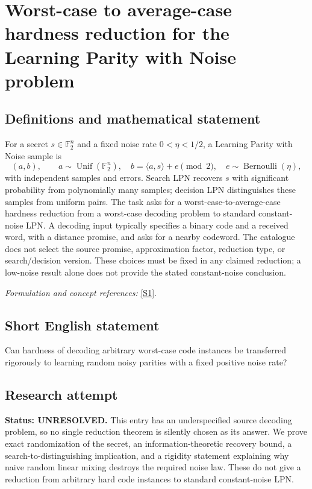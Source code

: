 \documentclass[11pt]{article}
\begin{document}
\section*{\texorpdfstring{Worst-case to average-case hardness reduction for the Learning Parity with Noise problem}{Worst-case to average-case hardness reduction for the Learning Parity with Noise problem}}\label{30006864}
\subsection{Definitions and mathematical statement}
For a secret $s\in{\mathbb{F}}_2^n$ and a fixed noise rate $0<\eta<1/2$, a Learning Parity with Noise sample is
\[
 (a,b),\qquad a\sim\operatorname{Unif}({\mathbb{F}}_2^n),\quad
 b=\langle a,s\rangle+e\pmod2,\quad e\sim\operatorname{Bernoulli}(\eta),
\]
with independent samples and errors. Search LPN recovers $s$ with significant probability from polynomially many samples; decision LPN distinguishes these samples from uniform pairs. The task asks for a worst-case-to-average-case hardness reduction from a worst-case decoding problem to standard constant-noise LPN. A decoding input typically specifies a binary code and a received word, with a distance promise, and asks for a nearby codeword. The catalogue does not select the source promise, approximation factor, reduction type, or search/decision version. These choices must be fixed in any claimed reduction; a low-noise result alone does not provide the stated constant-noise conclusion.
\par\smallskip\textit{Formulation and concept references:} \href{https://eprint.iacr.org/2026/1168}{[S1]}.

\subsection{Short English statement}
Can hardness of decoding arbitrary worst-case code instances be transferred rigorously to learning random noisy parities with a fixed positive noise rate?
\subsection{Research attempt}
\textbf{Status: UNRESOLVED.} This entry has an underspecified source decoding problem, so no single reduction theorem is silently chosen as its answer. We prove exact randomization of the secret, an information-theoretic recovery bound, a search-to-distinguishing implication, and a rigidity statement explaining why naive random linear mixing destroys the required noise law. These do not give a reduction from arbitrary hard code instances to standard constant-noise LPN.
\end{document}
